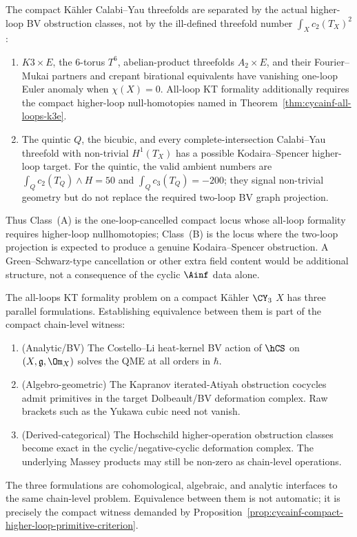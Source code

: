 \begin{remark}
\label{rem:cycainf-all-loops-dichotomy}
The compact K\"ahler Calabi--Yau threefolds are separated by the
actual higher-loop BV obstruction classes, not by the ill-defined
threefold number $\int_X c_2(T_X)^2$:
\begin{enumerate}[label=(\Alph*)]
\item $K3 \times E$, the $6$-torus $T^6$, abelian-product
threefolds $A_2 \times E$, and their Fourier--Mukai partners and
crepant birational equivalents have vanishing one-loop Euler anomaly
when $\chi(X)=0$. All-loop KT formality additionally requires the
compact higher-loop null-homotopies named in
Theorem~\ref{thm:cycainf-all-loops-k3e}.
\item The quintic $Q$, the bicubic, and every complete-intersection
Calabi--Yau threefold with non-trivial $H^1(T_X)$ has a possible
Kodaira--Spencer higher-loop target. For the quintic, the valid
ambient numbers are $\int_Q c_2(T_Q)\wedge H=50$ and
$\int_Q c_3(T_Q)=-200$; they signal non-trivial geometry but do not
replace the required two-loop BV graph projection.
\end{enumerate}
Thus Class~(A) is the one-loop-cancelled compact locus whose all-loop
formality requires higher-loop nullhomotopies; Class~(B) is the locus
where the two-loop projection is expected to produce a genuine
Kodaira--Spencer obstruction. A Green--Schwarz-type cancellation or
other extra field content would be additional structure, not a
consequence of the cyclic $\Ainf$ data alone.
\end{remark}

\begin{remark}
\label{rem:cycainf-three-lenses}
The all-loops KT formality problem on a compact K\"ahler $\CY_3$ $X$
has three parallel formulations. Establishing equivalence between
them is part of the compact chain-level witness:
\begin{enumerate}[label=\textup{(\arabic*)}]
\item (Analytic/BV) The Costello--Li heat-kernel BV action of
$\hCS$ on $(X, \mathfrak g, \Om_X)$ solves the QME at all orders
in $\hbar$.
\item (Algebro-geometric) The Kapranov iterated-Atiyah obstruction
cocycles admit primitives in the target Dolbeault/BV deformation
complex. Raw brackets such as the Yukawa cubic need not vanish.
\item (Derived-categorical) The Hochschild higher-operation obstruction
classes become exact in the cyclic/negative-cyclic deformation complex.
The underlying Massey products may still be non-zero as chain-level
operations.
\end{enumerate}
The three formulations are cohomological, algebraic, and analytic
interfaces to the same chain-level problem. Equivalence between them is
not automatic; it is precisely the compact witness demanded by
Proposition~\ref{prop:cycainf-compact-higher-loop-primitive-criterion}.
\end{remark}

